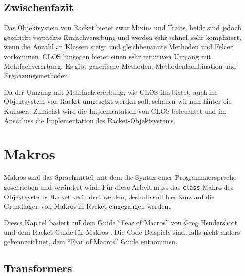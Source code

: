
\pagestyle{diplHeadings}





\setcounter{page}{1}
\tableofcontents
\cleardoublepage 

\setcounter{page}{1} 
\mainmatter  
{}

 

 


\section{Zwischenfazit}
Das Objektsystem von Racket bietet zwar Mixins und Traits, beide sind jedoch geschickt verpackte Einfachvererbung und werden sehr schnell sehr kompliziert, wenn die Anzahl an Klassen steigt und gleichbenannte Methoden und Felder vorkommen. CLOS hingegen bietet einen sehr intuitiven Umgang mit Mehrfachvererbung. Es gibt generische Methoden, Methodenkombination und Ergänzungsmethoden.

Da der Umgang mit Mehrfachvererbung, wie CLOS ihn bietet, auch im Objektsystem von Racket umgesetzt werden soll, schauen wir nun hinter die Kulissen. Zunächst wird die Implementation von CLOS beleuchtet und im Anschluss die Implementation des Racket-Objektsystems.




\chapter{Makros} 
\label{makros}
Makros sind das Sprachmittel, mit dem die Syntax einer Programmiersprache geschrieben und verändert wird. Für diese Arbeit muss das \texttt{class}-Makro des Objektsystems Racket verändert werden, deshalb soll hier kurz auf die Grundlagen von Makros in Racket eingegangen werden.

Dieses Kapitel basiert auf dem Guide ``Fear of Macros'' von Greg Hendershott \cite{fearofmacros} und dem Racket-Guide für Makros \cite{racketguide-macros}. Die Code-Beispiele sind, falls nicht anders gekennzeichnet, dem ``Fear of Macros'' Guide entnommen.


\section{Transformers}

